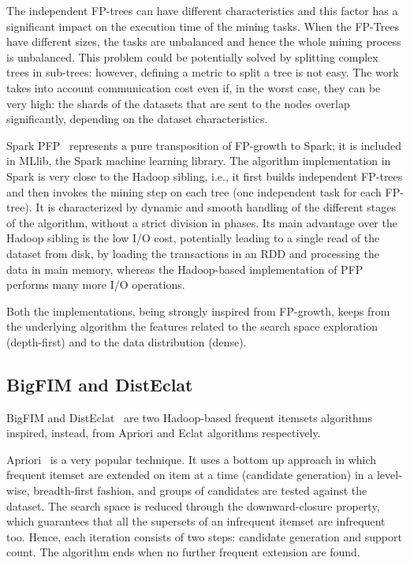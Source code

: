 The independent FP-trees can have different characteristics and this factor has
a significant impact on the execution time of the mining tasks. When the
FP-Trees have different sizes, the tasks are unbalanced and hence the whole
mining process is unbalanced. This problem could be potentially solved by
splitting complex trees in sub-trees: however, defining a metric to split a tree
is not easy. The work takes into account communication cost even if, in the
worst case, they can be very high: the shards of the datasets that are sent to
the nodes overlap significantly, depending on the dataset characteristics.

Spark PFP~\cite{MLLib} represents a pure transposition of FP-growth to Spark; it
is included in MLlib, the Spark machine learning library. The algorithm
implementation in Spark is very close to the Hadoop sibling, i.e., it first
builds independent FP-trees and then invokes the mining step on each tree (one
independent task for each FP-tree). It is characterized by dynamic and smooth
handling of the different stages of the algorithm, without a strict division in
phases. Its main advantage over the Hadoop sibling is the low I/O cost,
potentially leading to a single read of the dataset from disk, by loading the
transactions in an RDD and processing the data in main memory, whereas the
Hadoop-based implementation of PFP performs many more I/O operations.

Both the implementations, being strongly inspired from FP-growth, keeps from the
underlying algorithm the features related to the search space exploration
(depth-first) and to the data distribution (dense).


\subsection{BigFIM and DistEclat}
\label{bigfim}
BigFIM and DistEclat~\cite{bigfim} are two Hadoop-based frequent itemsets
algorithms inspired, instead, from Apriori and Eclat algorithms respectively.

Apriori~\cite{Agr94} is a very popular technique. It uses a bottom up approach
in which frequent itemset are extended on item at a time (candidate generation)
in a level-wise, breadth-first fashion, and groups of candidates are tested against the
dataset. The search space is reduced through the downward-closure property,
which guarantees that all the supersets of an infrequent itemset are infrequent
too. Hence, each iteration consists of two steps: candidate generation and
support count. The algorithm ends when no further frequent extension are found.

